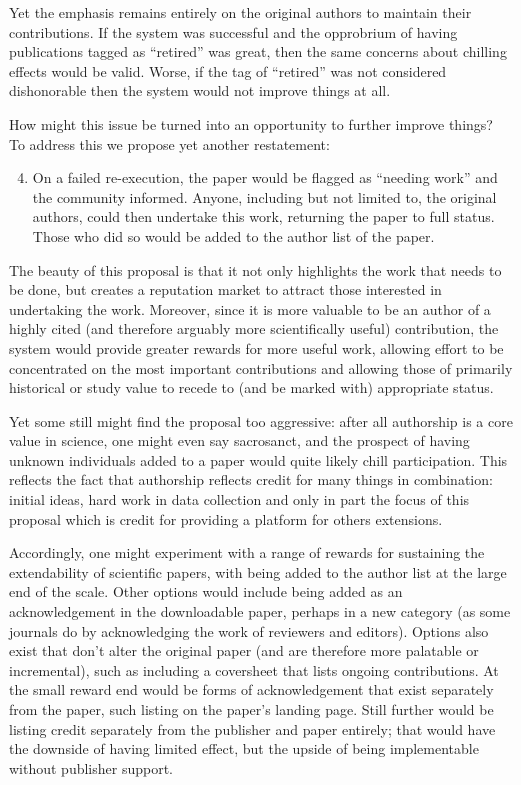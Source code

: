 \documentclass{sigchi}
\begin{document}
Yet the emphasis remains entirely on the original authors to maintain their contributions. If the system was successful and the opprobrium of having publications tagged as ``retired'' was great, then the same concerns about chilling effects would be valid. Worse, if the tag of ``retired'' was not considered dishonorable then the system would not improve things at all. 

How might this issue be turned into an opportunity to further improve things? To address this we propose yet another restatement:

\begin{enumerate}
	\setcounter{enumi}{3}
\item On a failed re-execution, the paper would be flagged as ``needing work'' and the community informed. Anyone, including but not limited to, the original authors, could then undertake this work, returning the paper to full status. Those who did so would be added to the author list of the paper.
\end{enumerate}

The beauty of this proposal is that it not only highlights the work that needs to be done, but creates a reputation market to attract those interested in undertaking the work. Moreover, since it is more valuable to be an author of a highly cited (and therefore arguably more scientifically useful) contribution, the system would provide greater rewards for more useful work, allowing effort to be concentrated on the most important contributions and allowing those of primarily historical or study value to recede to (and be marked with) appropriate status.

Yet some still might find the proposal too aggressive: after all authorship is a core value in science, one might even say sacrosanct, and the prospect of having unknown individuals added to a paper would quite likely chill participation. This reflects the fact that authorship reflects credit for many things in combination: initial ideas, hard work in data collection and only in part the focus of this proposal which is credit for providing a platform for others extensions.  

Accordingly, one might experiment with a range of rewards for sustaining the extendability of scientific papers, with being added to the author list at the large end of the scale. Other options would include being added as an acknowledgement in the downloadable paper, perhaps in a new category (as some journals do by acknowledging the work of reviewers and editors). Options also exist that don't alter the original paper (and are therefore more palatable or incremental), such as including a coversheet that lists ongoing contributions. At the small reward end would be forms of acknowledgement that exist separately from the paper, such listing on the paper's landing page. Still further would be listing credit separately from the publisher and paper entirely; that would have the downside of having limited effect, but the upside of being implementable without publisher support.
\end{document}
